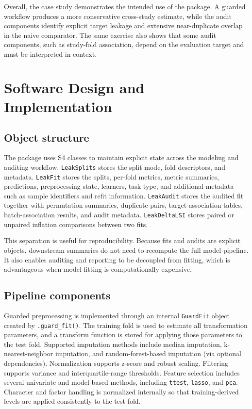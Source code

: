\documentclass[article]{jss}
\begin{document}
Overall, the case study demonstrates the intended use of the package. A guarded
workflow produces a more conservative cross-study estimate, while the audit
components identify explicit target leakage and extensive near-duplicate overlap
in the naive comparator. The same exercise also shows that some audit
components, such as study-fold association, depend on the evaluation target and
must be interpreted in context.

\section{Software Design and Implementation}

\subsection{Object structure}

The package uses S4 classes to maintain explicit state across the modeling and
auditing workflow. \texttt{LeakSplits} stores the split mode, fold descriptors,
and metadata. \texttt{LeakFit} stores the splits, per-fold metrics,
metric summaries, predictions, preprocessing state, learners, task type, and
additional metadata such as sample identifiers and refit information.
\texttt{LeakAudit} stores the audited fit together with permutation summaries,
duplicate pairs, target-association tables, batch-association results, and
audit metadata. \texttt{LeakDeltaLSI} stores paired or unpaired inflation
comparisons between two fits.

This separation is useful for reproducibility. Because fits and audits are
explicit objects, downstream summaries do not need to recompute the full model
pipeline. It also enables auditing and reporting to be decoupled from fitting,
which is advantageous when model fitting is computationally expensive.

\subsection{Pipeline components}

Guarded preprocessing is implemented through an internal \texttt{GuardFit}
object created by \texttt{.guard\_fit()}. The training fold is used to estimate
all transformation parameters, and a transform function is stored for applying
those parameters to the test fold. Supported imputation methods include median
imputation, k-nearest-neighbor imputation, and random-forest-based imputation
(via optional dependencies). Normalization supports z-score and robust scaling.
Filtering supports variance and interquartile-range thresholds. Feature
selection includes several univariate and model-based methods, including
\texttt{ttest}, \texttt{lasso}, and \texttt{pca}. Character and factor handling
is normalized internally so that training-derived levels are applied
consistently to the test fold.
\end{document}
